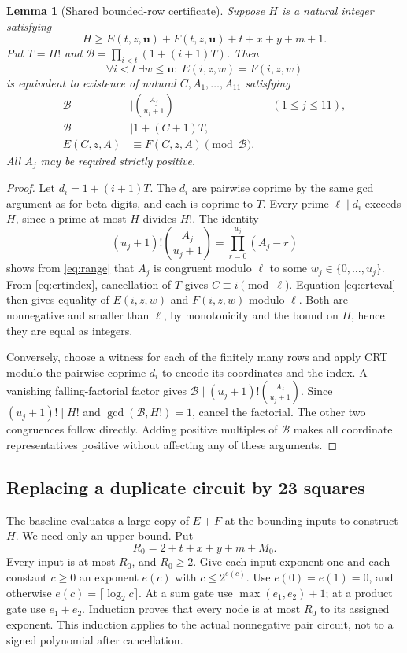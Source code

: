 \documentclass[11pt,letterpaper]{article}
\newtheorem{lemma}[theorem]{Lemma}
\theoremstyle{definition}\newtheorem{definition}[theorem]{Definition}
\theoremstyle{remark}\newtheorem{remark}[theorem]{Remark}
\begin{document}
\begin{lemma}[Shared bounded-row certificate]\label{lem:crt}
Suppose $H$ is a natural integer satisfying
\[
 H\ge E(t,z,\mathbf u)+F(t,z,\mathbf u)+t+x+y+m+1.
\]
Put $T=H!$ and $\mathcal B=\prod_{i<t}(1+(i+1)T)$. Then
\[
 \forall i<t\ \exists w\le\mathbf u:\ E(i,z,w)=F(i,z,w)
\]
is equivalent to existence of natural $C,A_1,\ldots,A_{11}$ satisfying
\begin{align}
 \mathcal B&\mid\binom{A_j}{u_j+1} &&(1\le j\le11),\label{eq:range}\\
 \mathcal B&\mid 1+(C+1)T,\label{eq:crtindex}\\
 E(C,z,A)&\equiv F(C,z,A)\pmod{\mathcal B}.\label{eq:crteval}
\end{align}
All $A_j$ may be required strictly positive.
\end{lemma}
\begin{proof}
Let $d_i=1+(i+1)T$. The $d_i$ are pairwise coprime by the same gcd
argument as for beta digits, and each is coprime to $T$. Every prime
$\ell\mid d_i$ exceeds $H$, since a prime at most $H$ divides $H!$.
The identity
\[
 (u_j+1)!\binom{A_j}{u_j+1}=\prod_{r=0}^{u_j}(A_j-r)
\]
shows from \eqref{eq:range} that $A_j$ is congruent modulo $\ell$ to
some $w_j\in\{0,\ldots,u_j\}$. From \eqref{eq:crtindex}, cancellation
of $T$ gives $C\equiv i\pmod\ell$. Equation \eqref{eq:crteval} then
gives equality of $E(i,z,w)$ and $F(i,z,w)$ modulo $\ell$.
Both are nonnegative and smaller than $\ell$, by monotonicity and the
bound on $H$, hence they are equal as integers.

Conversely, choose a witness for each of the finitely many rows and
apply CRT modulo the pairwise coprime $d_i$ to encode its coordinates
and the index. A vanishing falling-factorial factor gives
$\mathcal B\mid (u_j+1)!\binom{A_j}{u_j+1}$. Since
$(u_j+1)!\mid H!$ and $\gcd(\mathcal B,H!)=1$, cancel the factorial.
The other two congruences follow directly. Adding positive multiples of
$\mathcal B$ makes all coordinate representatives positive without
affecting any of these arguments.
\end{proof}

\subsection{Replacing a duplicate circuit by 23 squares}

The baseline evaluates a large copy of $E+F$ at the bounding inputs to
construct $H$. We need only an upper bound. Put
\[
 R_0=2+t+x+y+m+M_0.
\]
Every input is at most $R_0$, and $R_0\ge2$. Give each input exponent
one and each constant $c\ge0$ an exponent $e(c)$ with $c\le2^{e(c)}$.
Use $e(0)=e(1)=0$, and otherwise $e(c)=\lceil\log_2c\rceil$.
At a sum gate use $\max(e_1,e_2)+1$; at a product gate use $e_1+e_2$.
Induction proves that every node is at most $R_0$ to its assigned
exponent. This induction applies to the actual nonnegative pair circuit,
not to a signed polynomial after cancellation.
\end{document}
